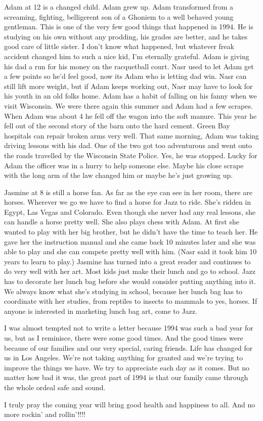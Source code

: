 Adam at 12 is a changed child. Adam grew up. Adam transformed from a screaming, fighting, belligerent son of a Ghoniem to a well behaved young
gentleman. This is one of the very few good things that happened in 1994. He is studying on his own without any prodding, his grades are better,
and he takes good care of little sister. I don't know what happened, but whatever freak accident changed him to such a nice kid, I'm eternally
grateful. Adam is giving his dad a run for his money on the racquetball court. Nasr used to let Adam get a few points so he'd feel good, now its
Adam who is letting dad win. Nasr can still lift more weight, but if Adam keeps working out, Nasr may have to look for his youth in an old folks
home. Adam has a habit of falling on his fanny when we visit Wisconsin. We were there again this summer and Adam had a few scrapes. When Adam
was about 4 he fell off the wagon into the soft manure. This year he fell out of the second story of the barn onto the hard cement. Green Bay
hospitals can repair broken arms very well. That same morning, Adam was taking driving lessons with his dad. One of the two got too adventurous
and went onto the roads travelled by the Wisconsin State Police. Yes, he was stopped. Lucky for Adam the officer was in a hurry to help someone
else. Maybe his close scrape with the long arm of the law changed him or maybe he's just growing up.

Jasmine at 8 is still a horse fan. As far as the eye can see in her room, there are horses. Wherever we go we have to find a horse for Jazz to
ride. She's ridden in Egypt, Las Vegas and Colorado. Even though she never had any real lessons, she can handle a horse pretty well. She also
plays chess with Adam. At first she wanted to play with her big brother, but he didn't have the time to teach her. He gave her the instruction
manual and she came back 10 minutes later and she was able to play and she can compete pretty well with him. (Nasr said it took him 10 years to
learn to play.) Jasmine has turned into a great reader and continues to do very well with her art. Most kids just make their lunch and go to
school. Jazz has to decorate her lunch bag before she would consider putting anything into it. We always know what she's studying in school,
because her lunch bag has to coordinate with her studies, from reptiles to insects to mammals to yes, horses. If anyone is interested in
marketing lunch bag art, come to Jazz.

I was almost tempted not to write a letter because 1994 was such a bad year for us, but as I reminisce, there were some good times. And the good
times were because of our families and our very special, caring friends. Life has changed for us in Los Angeles. We're not taking anything for
granted and we're trying to improve the things we have. We try to appreciate each day as it comes. But no matter how bad it was, the great part
of 1994 is that our family came through the whole ordeal safe and sound.

I truly pray the coming year will bring good health and happiness to all. And no more rockin' and rollin'!!!!



%
